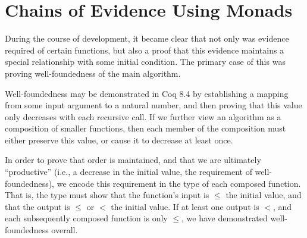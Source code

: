 \documentclass{llncs}
\begin{document}





\section{Chains of Evidence Using Monads}
\label{sec:pfmorph}

During the course of development, it became clear that not only was evidence
required of certain functions, but also a proof that this evidence maintains a
special relationship with some initial condition.  The primary case of this
was proving well-foundedness of the main algorithm.

Well-foundedness may be demonstrated in Coq 8.4 by establishing a mapping from
some input argument to a natural number, and then proving that this value only
decreases with each recursive call.  If we further view an algorithm as a
composition of smaller functions, then each member of the composition must
either preserve this value, or cause it to decrease at least once.

In order to prove that order is maintained, and that we are ultimately
``productive'' (i.e., a decrease in the initial value, the requirement of
well-foundedness), we encode this requirement in the type of each composed
function.  That is, the type must show that the function's input is $\le$ the
initial value, and that the output is $\le$ or $<$ the initial value.  If at
least one output is $<$, and each subsequently composed function is only
$\le$, we have demonstrated well-foundedness overall.
\end{document}
